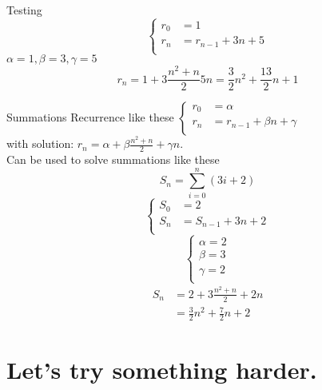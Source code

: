 Testing
\begin{equation*}
    \left\{
        \begin{array}{ll}
            r_0 &= 1\\
            r_n &= r_{n-1}+3 n+5\\
        \end{array}
    \right.
\end{equation*}
$ \alpha = 1, \beta = 3, \gamma = 5 $ 
\begin{equation*}
    r_n = 1+3 \frac{n^2+n}{2}5n = \frac{3}{2}n^2+\frac{13}{2}n+1
\end{equation*}

Summations
Recurrence like these $ \left\{
    \begin{array}{ll}
        r_0 &= \alpha \\
        r_n &= r_{n-1}+\beta n+\gamma \\
    \end{array}
\right. $ \\
with solution: $ r_n = \alpha + \beta \frac{n^2+n}{2}+ \gamma n $. \\
Can be used to solve summations like these 
\begin{equation*}
    S_n = \sum_{i=0}^{n}(3i+2)
\end{equation*}
\begin{equation*}
    \left\{
        \begin{array}{ll}
            S_0 &= 2 \\
            S_n &= S_{n-1}+3n+2 \\
        \end{array}
    \right.
\end{equation*}
\begin{equation*}
    \left\{
        \begin{array}{l}
            \alpha = 2\\
            \beta=3\\
            \gamma=2\\
        \end{array}
    \right.
\end{equation*}
\begin{align*}
    S_n &= 2+3\frac{n^2+n}{2}+2n\\
        &= \frac{3}{2}n^2+\frac{7}{2}n+2
\end{align*}

\section{Let's try something harder.}

